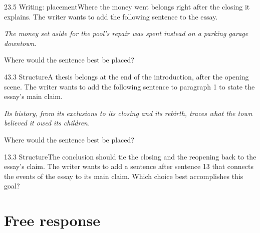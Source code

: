 \documentclass[11pt]{article}
\begin{document}
\begin{q}{2}{3.5 Writing: placement}{Where the money went belongs right after the closing it explains.}
The writer wants to add the following sentence to the essay.

\emph{The money set aside for the pool's repair was spent instead on a parking garage downtown.}

Where would the sentence best be placed?
\end{q}

\begin{q}{4}{3.3 Structure}{A thesis belongs at the end of the introduction, after the opening scene.}
The writer wants to add the following sentence to paragraph 1 to state the essay's main claim.

\emph{Its history, from its exclusions to its closing and its rebirth, traces what the town believed it owed its children.}

Where would the sentence best be placed?
\end{q}

\begin{q}{1}{3.3 Structure}{The conclusion should tie the closing and the reopening back to the essay's claim.}
The writer wants to add a sentence after sentence 13 that connects the events of the essay to its main claim. Which choice best accomplishes this goal?
\end{q}

\section{Free response}
\end{document}
